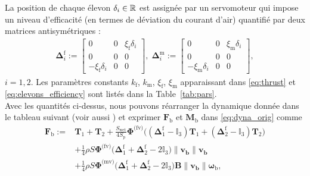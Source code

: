 La position de chaque élevon $\delta_i \in {\mathbb R}$ est assignée par un servomoteur qui impose un niveau d'efficacité (en termes de déviation du courant d'air) quantifié par deux matrices antisymétriques :
\begin{align}
\label{eq:elevons_efficiency}
    \boldsymbol{\Delta}^{\text{f}}_{i} \!:=\! \begin{bmatrix} 0 & 0 & \xi_{\text{f}}\delta_{i} \\ 0 & 0 & 0 \\ -\xi_{\text{f}}\delta_{i} & 0 & 0 \end{bmatrix}\! ,\;
    \boldsymbol{\Delta}^{\text{m}}_{i} \!:=\! \begin{bmatrix} 0 & 0 & \xi_{\text{m}}\delta_{i} \\ 0 & 0 & 0 \\ -\xi_{\text{m}}\delta_{i} & 0 & 0 \end{bmatrix} \!, 
\end{align}
$i=1,2$. Les paramètres constants $k_{\text{f}}$, $k_{\text{m}}$, $\xi_{\text{f}}$, $\xi_{\text{m}}$ apparaissant dans \eqref{eq:thrust} et \eqref{eq:elevons_efficiency} sont listés dans la Table~\ref{tab:pars}.\\
Avec les quantités ci-dessus, nous pouvons réarranger la dynamique donnée dans le tableau suivant \cite[eqns (97),~(98)]{lustosa:hal-03035938} (voir aussi \cite{sansou:stage}) et exprimer $\boldsymbol{F}_{\text{b}}$ et $\boldsymbol{M}_{\text{b}}$ dans \eqref{eq:dyna_orig} comme
%
\begin{align}
\nonumber
    \boldsymbol{F}_{\text{b}} :={}&  \boldsymbol{T}_{1} + \boldsymbol{T}_{2} + \frac{S_{\text{wet}}}{4S_{\text{p}}} \boldsymbol{\Phi}^{\text{(fv)}} \Big( (\boldsymbol{\Delta}^{\text{f}}_1 - \mathbb{I}_{3} ) \boldsymbol{T}_{1} + ( \boldsymbol{\Delta}^{\text{f}}_2 - \mathbb{I}_{3}) \boldsymbol{T}_{2}\Big) \\ 
     \label{eq:Fb}
    &+ \frac{1}{4} \rho S  \boldsymbol{\Phi}^{\text{(fv)}} \Big(\boldsymbol{\Delta}^{\text{f}}_1+ \boldsymbol{\Delta}^{\text{f}}_2 - 2 \mathbb{I}_{3} \Big) \lVert \boldsymbol{v_{\text{b}}} \rVert \boldsymbol{v_{\text{b}}}\\
    \nonumber
    &+ \frac{1}{4} \rho S \boldsymbol{\Phi}^{\text{(mv)}} \Big(\boldsymbol{\Delta}^{\text{f}}_1 + \boldsymbol{\Delta}^{\text{f}}_2 - 2\mathbb{I}_{3}\Big) \boldsymbol{B} \lVert \boldsymbol{v_{\text{b}}} \rVert  \boldsymbol{\omega}_{\text{b}}, 
\end{align}
